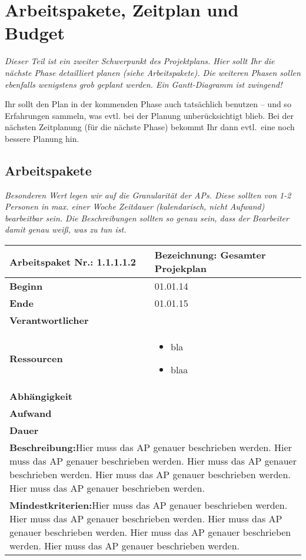 \documentclass[fontsize=12pt,paper=a4,twoside]{scrartcl}
\begin{document}

\section{Arbeitspakete, Zeitplan und Budget}

{\em Dieser Teil ist ein zweiter Schwerpunkt des Projektplans. Hier sollt Ihr die nächste Phase detailliert planen (siehe Arbeitspakete). Die weiteren Phasen sollen ebenfalls wenigstens grob geplant werden. Ein Gantt-Diagramm ist zwingend! 

Ihr sollt den Plan in der kommenden Phase auch tatsächlich benutzen -- und so
  Erfahrungen sammeln, was evtl. bei der Planung unberücksichtigt
  blieb. Bei der nächsten Zeitplanung (für die nächste Phase) bekommt
  Ihr dann evtl.\ eine noch bessere Planung hin.}

\subsection{Arbeitspakete}\label{aps}


{\em Besonderen Wert legen wir auf die Granularität der APs. Diese
  sollten von 1-2 Personen in max. einer Woche Zeitdauer (kalendarisch, nicht
  Aufwand) bearbeitbar sein. Die Beschreibungen sollten so genau sein,
  dass der Bearbeiter damit genau weiß, was zu tun ist.}
  

\begin{tabular}{|p{5.3cm}|p{9.7cm}|}\hline
   \textbf{Arbeitspaket Nr.:} 1.1.1.1.2 & \textbf{Bezeichnung:} Gesamter Projekplan\\ \hline \hline
   \textbf{Beginn} & 01.01.14\\ \hline
   \textbf{Ende} & 01.01.15\\ \hline
   \textbf{Verantwortlicher} & \\ \hline
   \textbf{Ressourcen} & \begin{itemize}
   \item bla
   \item blaa
\end{itemize}    \\ \hline
\textbf{Abhängigkeit} &\\ \hline
 \textbf{Aufwand} & \\ \hline
 \textbf{Dauer} & \\ \hline
   \multicolumn{2}{|p{15cm}|}{\textbf{Beschreibung:}\newline  Hier muss das AP genauer beschrieben werden. Hier muss das AP genauer beschrieben werden. Hier muss das AP genauer beschrieben werden. Hier muss das AP genauer beschrieben werden. Hier muss das AP genauer beschrieben werden. }\\ \hline
    \multicolumn{2}{|p{15cm}|}{\textbf{Mindestkriterien:}\newline  Hier muss das AP genauer beschrieben werden. Hier muss das AP genauer beschrieben werden. Hier muss das AP genauer beschrieben werden. Hier muss das AP genauer beschrieben werden. Hier muss das AP genauer beschrieben werden. }\\ \hline
 \end{tabular}
 
\end{document}
